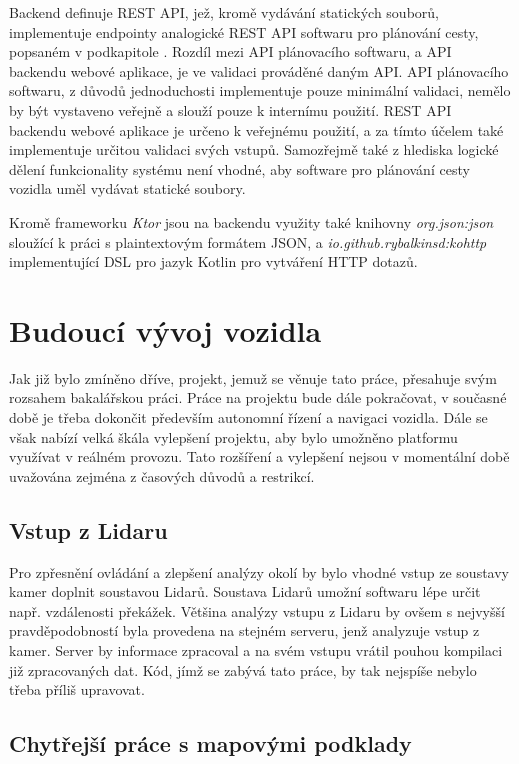 \documentclass[czech, bachelor]{diploma}
\begin{document}
Backend definuje REST API, jež, kromě vydávání statických souborů, implementuje endpointy analogické REST API softwaru 
pro plánování cesty, popsaném v podkapitole . Rozdíl mezi API plánovacího softwaru, a API backendu webové 
aplikace, je ve validaci prováděné daným API. API plánovacího softwaru, z důvodů jednoduchosti implementuje pouze minimální 
validaci, nemělo by být vystaveno veřejně a slouží pouze k internímu použití. REST API backendu webové aplikace je určeno 
k veřejnému použití, a za tímto účelem také implementuje určitou validaci svých vstupů. Samozřejmě také z hlediska logické dělení
funkcionality systému není vhodné, aby software pro plánování cesty vozidla uměl vydávat statické soubory.

Kromě frameworku \emph{Ktor} jsou na backendu využity také knihovny \emph{org.json:json} sloužící k práci s plaintextovým formátem
JSON, a \emph{io.github.rybalkinsd:kohttp} implementující DSL pro jazyk Kotlin pro vytváření HTTP dotazů.

\chapter{Budoucí vývoj vozidla}

Jak již bylo zmíněno dříve, projekt, jemuž se věnuje tato práce, přesahuje svým rozsahem bakalářskou práci. Práce na projektu bude
dále pokračovat, v současné době je třeba dokončit především autonomní řízení a navigaci vozidla. Dále se však nabízí velká škála
vylepšení projektu, aby bylo umožněno platformu využívat v reálném provozu. Tato rozšíření a vylepšení nejsou v momentální době
uvažována zejména z časových důvodů a restrikcí.

\section{Vstup z Lidaru}

Pro zpřesnění ovládání a zlepšení analýzy okolí by bylo vhodné vstup ze soustavy kamer doplnit soustavou Lidarů. Soustava Lidarů
umožní softwaru lépe určit např. vzdálenosti překážek. Většina analýzy vstupu z Lidaru by ovšem s nejvyšší pravděpodobností byla
provedena na stejném serveru, jenž analyzuje vstup z kamer. Server by informace zpracoval a na svém vstupu vrátil pouhou kompilaci
již zpracovaných dat. Kód, jímž se zabývá tato práce, by tak nejspíše nebylo třeba příliš upravovat.

\section{Chytřejší práce s mapovými podklady} \label{smarter-maps}
\end{document}
